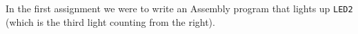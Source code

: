 In the first assignment we were to write an Assembly program that lights up \texttt{LED2} (which is the third light counting from the right).
